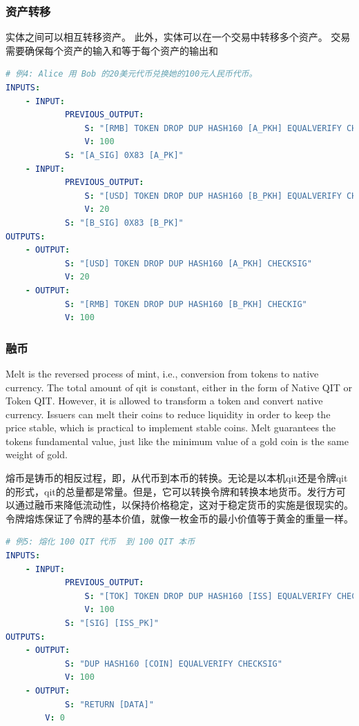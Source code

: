 \documentclass[a4paper,11pt]{article}
\begin{document}
\subsubsection{资产转移}

实体之间可以相互转移资产。
此外，实体可以在一个交易中转移多个资产。
交易需要确保每个资产的输入和等于每个资产的输出和

\lstset{basicstyle=\tiny,style=myListStyle}
\begin{lstlisting}[language=yaml, numbers=none,basicstyle=\footnotesize]
# 例4: Alice 用 Bob 的20美元代币兑换她的100元人民币代币。
INPUTS:
	- INPUT:
			PREVIOUS_OUTPUT:
				S: "[RMB] TOKEN DROP DUP HASH160 [A_PKH] EQUALVERIFY CHECKSIG"
				V: 100
			S: "[A_SIG] 0X83 [A_PK]"
	- INPUT:
			PREVIOUS_OUTPUT:
				S: "[USD] TOKEN DROP DUP HASH160 [B_PKH] EQUALVERIFY CHECKSIG"
				V: 20
			S: "[B_SIG] 0X83 [B_PK]"
OUTPUTS:
	- OUTPUT:
			S: "[USD] TOKEN DROP DUP HASH160 [A_PKH] CHECKSIG"
			V: 20
	- OUTPUT:
			S: "[RMB] TOKEN DROP DUP HASH160 [B_PKH] CHECKIG"
			V: 100
\end{lstlisting}


\subsubsection{融币}

Melt is the reversed process of mint, i.e., conversion from tokens to native currency. The total amount of qit is constant, either in the form of Native QIT or Token QIT. However, it is allowed to transform a token and convert native currency. Issuers can melt their coins to reduce liquidity in order to keep the price stable, which is practical to implement stable coins. Melt guarantees the tokens fundamental value, just like the minimum value of a gold coin is the same weight of gold.   

熔币是铸币的相反过程，即，从代币到本币的转换。无论是以本机qit还是令牌qit的形式，qit的总量都是常量。但是，它可以转换令牌和转换本地货币。发行方可以通过融币来降低流动性，以保持价格稳定，这对于稳定货币的实施是很现实的。令牌熔炼保证了令牌的基本价值，就像一枚金币的最小价值等于黄金的重量一样。

\lstset{basicstyle=\tiny,style=myListStyle}
\begin{lstlisting}[language=yaml, numbers=none,basicstyle=\footnotesize]
# 例5: 熔化 100 QIT 代币  到 100 QIT 本币 
INPUTS:
	- INPUT:
			PREVIOUS_OUTPUT:
				S: "[TOK] TOKEN DROP DUP HASH160 [ISS] EQUALVERIFY CHECKSIG"
				V: 100
			S: "[SIG] [ISS_PK]"
OUTPUTS:
	- OUTPUT:
			S: "DUP HASH160 [COIN] EQUALVERIFY CHECKSIG"
			V: 100
	- OUTPUT:
			S: "RETURN [DATA]"
		V: 0
\end{lstlisting}
\end{document}
